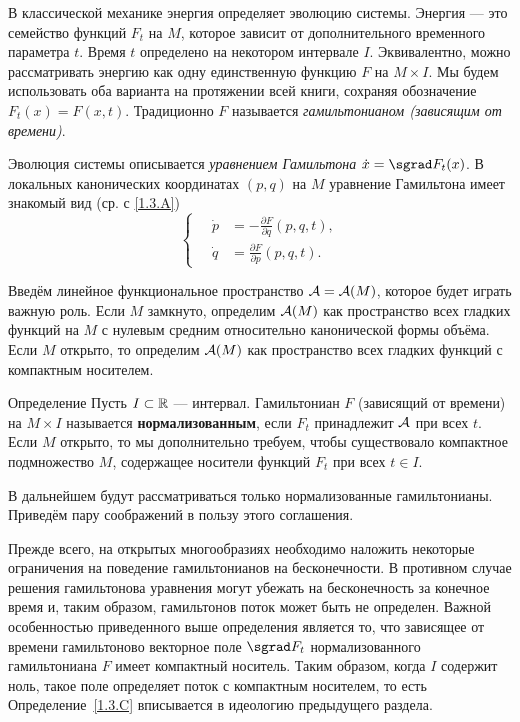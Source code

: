 В классической механике энергия определяет эволюцию системы.
Энергия — это семейство функций $F_t$ на $M$, которое зависит от
дополнительного временного параметра $t$.
Время $t$ определено на некотором интервале $I$.
Эквивалентно, можно рассматривать энергию как одну единственную функцию $F$ на $M \times I$.
Мы будем использовать оба варианта на протяжении всей книги, сохраняя обозначение $F_t (x) = F (x, t)$.
Традиционно $F$ называется \emph{гамильтонианом (зависящим от
  времени)}.

{\sloppy

Эволюция системы описывается \emph{уравнением Гамильтона} $\dot x \z= \sgrad F_t (x)$.
В локальных канонических координатах $(p, q)$ на $M$ уравнение
Гамильтона имеет знакомый вид (ср. с \ref{1.3.A})
\[
\begin{cases}
\quad\dot p &= - \tfrac{\partial F}{\partial q} (p, q, t),\\
\quad\dot q &= \tfrac{\partial F}{\partial p} (p, q, t).
\end{cases}
\]

}

Введём линейное функциональное пространство \index[symb]{$\A$}$\mathcal{A}=\mathcal{A}(M)$, которое будет играть важную роль.
Если $M$ замкнуто, определим $\mathcal{A}(M)$ как пространство всех гладких функций на $M$ с нулевым средним относительно канонической формы объёма.
Если $M$ открыто, то определим $\mathcal{A}(M)$ как пространство всех гладких функций с компактным носителем.

\begin{ex}{Определение}\label{1.3.C}
Пусть $I \subset \mathbb{R}$ — интервал.
Гамильтониан $F$ (зависящий от времени) на $M \times I$ называется \textbf{нормализованным}, если $F_t$ принадлежит $\A$ при всех $t$.
Если $M$ открыто, то мы дополнительно требуем, чтобы существовало компактное подмножество $M$, содержащее носители функций $F_t$ при всех $t \in I$.
\end{ex}

В дальнейшем будут рассматриваться только нормализованные гамильтонианы.
Приведём пару соображений в пользу этого соглашения.

Прежде всего, на открытых многообразиях необходимо наложить некоторые ограничения на поведение гамильтонианов на бесконечности.
В противном случае решения гамильтонова уравнения могут
убежать на бесконечность за конечное время и, таким образом, гамильтонов поток может быть не определен.
Важной особенностью приведенного выше определения является то, что зависящее от времени гамильтоново векторное поле $\sgrad F_t$ нормализованного гамильтониана $F$ имеет компактный носитель.
Таким образом, когда $I$ содержит ноль, такое поле определяет поток с
компактным носителем, то есть Определение~\ref{1.3.C} вписывается в идеологию предыдущего раздела.

